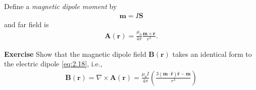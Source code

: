 \documentclass[a4paper]{article}
\begin{document}
Define a \emph{magnetic dipole moment} by 
\begin{equation*}\tag{3.21} \label{eq:3.21}
\begin{aligned}
\mathbf{m} = I\mathbf{S}
\end{aligned}
\end{equation*}
and far field is
\begin{equation*}\tag{3.22} \label{eq:3.22}
\begin{aligned}
\mathbf{A}(\mathbf{r}) = \frac{\mu_0}{4\pi} \frac{\mathbf{m} \times \mathbf{r}}{r^3}.
\end{aligned}
\end{equation*}

\textbf{Exercise} Show that the magnetic dipole field $\mathbf{B}(\mathbf{r})$ takes an identical form to the electric dipole \eqref{eq:2.18}, i.e.,
\begin{equation*}\tag{3.23} \label{eq:3.23}
\begin{aligned}
\mathbf{B}(\mathbf{r}) = \nabla \times \mathbf{A}(\mathbf{r}) = \frac{\mu_0I}{4\pi} \left(\frac{3(\mathbf{m} \cdot \hat{\mathbf{r}})\hat{\mathbf{r}}-\mathbf{m}}{r^3}\right)
\end{aligned}
\end{equation*}
\end{document}
